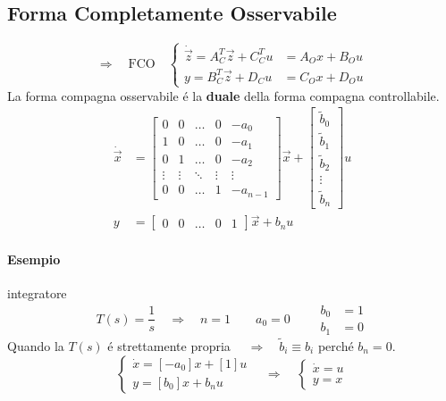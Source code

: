 \documentclass[../main.tex]{subfiles}
\begin{document}
	\subsection{Forma Completamente Osservabile}
		\[
			\Rightarrow\quad\text{FCO}\quad
			\begin{cases}
				\dot{\vec z} = A_C^T \vec z + C_C^T u &= A_O x + B_O u\\
				y = B_C^T \vec z + D_C u &= C_O x + D_O u
			\end{cases}
		\]
		La forma compagna osservabile \'e la \textbf{duale} della forma compagna controllabile.
		\[
			\begin{aligned}
				\dot{\vec x} &=
				\begin{bmatrix}
					0 & 0 & \dots & 0 & -a_0 \\
					1 & 0 & \dots & 0 & -a_1 \\
					0 & 1 & \dots & 0 & -a_2 \\
					\vdots & \vdots & \ddots & \vdots & \vdots \\
					0 & 0 & \dots & 1 & -a_{n-1}
				\end{bmatrix} \vec x+
				\begin{bmatrix}
					\tilde b_0\\
					\tilde b_1\\
					\tilde b_2\\
					\vdots\\
					\tilde b_n
				\end{bmatrix} u
				\\
				y &=
				\begin{bmatrix}
					0 & 0 & \dots & 0 & 1
				\end{bmatrix} \vec x + b_n u
			\end{aligned}
		\]
		
		\paragraph{Esempio} integratore
			\[
				T(s) = \dfrac{1}{s} \quad\Rightarrow\quad n=1 \qquad
				a_0 = 0 \qquad
				\begin{aligned}
					b_0 &= 1\\
					b_1 &= 0
				\end{aligned}
			\]
			Quando la $ T(s) $ \'e strettamente propria $ \quad\Rightarrow\quad \tilde b_i \equiv b_i $ perch\'e $ b_n = 0 $.
			\[
				\begin{cases}
					\dot x = [-a_0] x + [1] u\\
					y = [b_0] x + b_n u
				\end{cases}
				\quad\Rightarrow\quad
				\begin{cases}
					\dot x = u\\
					y = x
				\end{cases}
			\]
			
\end{document}
